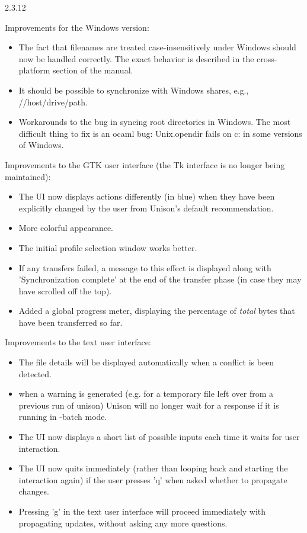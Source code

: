 \begin{changesfromversion}{2.3.12}
\item Improvements for the Windows version:
\begin{itemize}
\item The fact that filenames are treated case-insensitively under
Windows should now be handled correctly.  The exact behavior is described
in the cross-platform section of the manual.
\item It should be possible to synchronize with Windows shares, e.g.,
  //host/drive/path.
\item Workarounds to the bug in syncing root directories in Windows.
The most difficult thing to fix is an ocaml bug: Unix.opendir fails on
c: in some versions of Windows.
\end{itemize}

\item Improvements to the GTK user interface (the Tk interface is no
longer being maintained): 
\begin{itemize}
\item The UI now displays actions differently (in blue) when they have been
  explicitly changed by the user from Unison's default recommendation.
\item More colorful appearance.
\item The initial profile selection window works better.
\item If any transfers failed, a message to this effect is displayed along with
  'Synchronization complete' at the end of the transfer phase (in case they
  may have scrolled off the top).
\item Added a global progress meter, displaying the percentage of {\em total}
  bytes that have been transferred so far.
\end{itemize}

\item Improvements to the text user interface:
\begin{itemize}
\item The file details will be displayed automatically when a
  conflict is been detected.
\item when a warning is generated (e.g. for a temporary
  file left over from a previous run of unison) Unison will no longer
  wait for a response if it is running in -batch mode.
\item The UI now displays a short list of possible inputs each time it waits
  for user interaction.  
\item The UI now quits immediately (rather than looping back and starting
  the interaction again) if the user presses 'q' when asked whether to 
  propagate changes.
\item Pressing 'g' in the text user interface will proceed immediately
  with propagating updates, without asking any more questions.
\end{itemize}


\end{changesfromversion}
